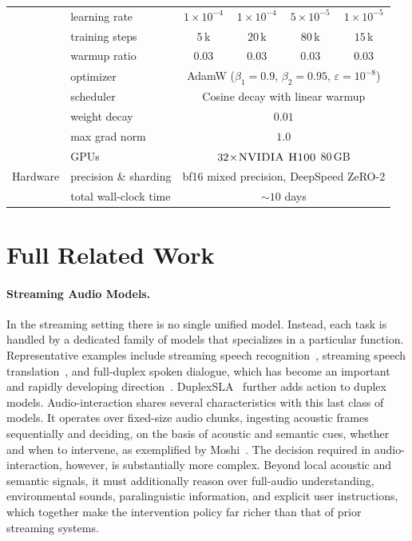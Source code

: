 \documentclass{article}
\begin{document}
\begin{table}[H]
\begin{tabular}{c|l|cccc}
  & learning rate             & $1\!\times\!10^{-4}$ & $1\!\times\!10^{-4}$ & $5\!\times\!10^{-5}$ & $1\!\times\!10^{-5}$ \\
  & training steps            & $5$\,k               & $20$\,k              & $80$\,k              & $15$\,k \\
  & warmup ratio              & $0.03$               & $0.03$               & $0.03$               & $0.03$ \\
  & optimizer                 & \multicolumn{4}{c}{AdamW ($\beta_1\!=\!0.9$, $\beta_2\!=\!0.95$, $\varepsilon\!=\!10^{-8}$)} \\
  & scheduler                 & \multicolumn{4}{c}{Cosine decay with linear warmup} \\
  & weight decay              & \multicolumn{4}{c}{$0.01$} \\
  & max grad norm             & \multicolumn{4}{c}{$1.0$} \\
\midrule
\multirow{3}{*}{Hardware}
  & GPUs                      & \multicolumn{4}{c}{$32\!\times\!\textsc{NVIDIA H100}$ $80$\,GB} \\
  & precision \& sharding     & \multicolumn{4}{c}{bf16 mixed precision, DeepSpeed ZeRO-2} \\
  & total wall-clock time     & \multicolumn{4}{c}{$\sim 10$ days} \\
\bottomrule
\end{tabular}
\end{table}

\newpage
\section{Full Related Work}

\paragraph{Streaming Audio Models.}
In the streaming setting there is no single unified model. Instead,
each task is handled by a dedicated family of models that specializes
in a particular function. Representative examples include streaming
speech recognition~\citep{gao2022paramformer}, streaming speech
translation~\citep{seamless}, and full-duplex spoken
dialogue, which has become an important and rapidly developing
direction~\citep{lslm, miniomni2, silent, chronological}. DuplexSLA~\citep{duplexsla} further adds action to duplex models. Audio-interaction shares several
characteristics with this last class of models. It operates over
fixed-size audio chunks, ingesting acoustic frames sequentially and
deciding, on the basis of acoustic and semantic cues, whether and when
to intervene, as exemplified by Moshi~\citep{defossez2024moshi}. The decision
required in audio-interaction, however, is substantially more complex.
Beyond local acoustic and semantic signals, it must additionally
reason over full-audio understanding, environmental sounds,
paralinguistic information, and explicit user instructions, which
together make the intervention policy far richer than that of prior
streaming systems.
\end{document}
